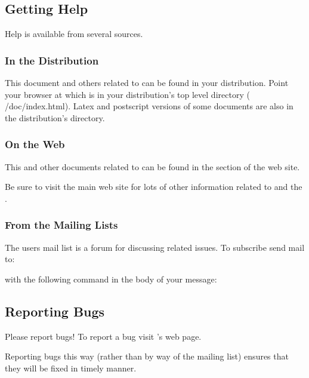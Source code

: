 \subsection{Getting Help}
\label{sec:help}

Help is available from several sources.

\subsubsection{In the Distribution}

This document and others related to \sr{} can be found in your \sr{}
distribution.  Point your browser at  which is in your
distribution's top level  directory (\ie{} /doc/index.html).  Latex and postscript versions of some
documents are also in the distribution's  directory.

\subsubsection{On the Web}

This and other documents related to \sr{} can be found in the
 section of the
\htmladdnormallinkfoot{\sci{}}{\sciurl{}} web site.

Be sure to visit the main \sci{} web site for lots of other
information related to \sr{} and the \scii{}.

\subsubsection{From the Mailing Lists}

The \sr{} users mail list is a forum for discussing \sr{} related issues.
To subscribe send mail to:


with the following command in the body of your message:


\subsection{Reporting Bugs}
\label{sec:bugs}

Please report bugs!  To report a bug visit \sr{}'s
 web page.

Reporting bugs this way (rather than by way of the mailing list) ensures
that they will be fixed in timely manner.



